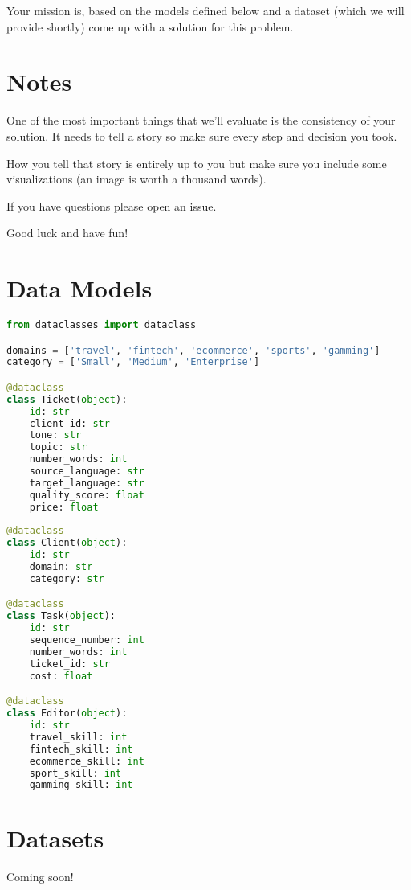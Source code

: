 \documentclass[]{extarticle}
\begin{document}
Your mission is, based on the models defined below and a dataset  (which we will provide shortly) come up with a solution for this problem.

\section{Notes}

One of the most important things that we'll evaluate is the consistency of your solution. It needs to tell a story so make sure every step and decision you took.

How you tell that story is entirely up to you but make sure you include some visualizations (an image is worth a thousand words).

If you have questions please open an issue.

Good luck and have fun!

\section{Data Models}

\begin{lstlisting}[language=Python]
from dataclasses import dataclass

domains = ['travel', 'fintech', 'ecommerce', 'sports', 'gamming']
category = ['Small', 'Medium', 'Enterprise']

@dataclass
class Ticket(object):
    id: str
    client_id: str
    tone: str
    topic: str
    number_words: int
    source_language: str
    target_language: str
    quality_score: float
    price: float
    
@dataclass
class Client(object):
    id: str
    domain: str
    category: str

@dataclass
class Task(object):
    id: str
    sequence_number: int
    number_words: int
    ticket_id: str
    cost: float

@dataclass
class Editor(object):
    id: str
    travel_skill: int
    fintech_skill: int
    ecommerce_skill: int
    sport_skill: int
    gamming_skill: int
\end{lstlisting}


\section{Datasets}

Coming soon!
\end{document}
